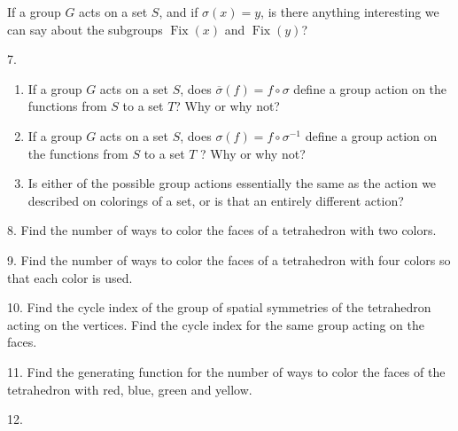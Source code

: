 \documentclass[10pt,]{book}
\theoremstyle{plain}
\theoremstyle{definition}
\theoremstyle{definition}
\numberwithin{equation}{chapter}
\newcommand{\importantarrow}{\Rightarrow}
\DeclareMathOperator{\Fix}{Fix}
\begin{document}
\begin{exerciselist}
If a group \(G\) acts on a set \(S\), and if \(\sigma(x) =y\), is there anything interesting we can say about the subgroups \(\Fix(x)\) and \(\Fix(y)\)?%
\par\smallskip
\item[7.]\marginsymbol[-1em]{} \hypertarget{exercise-60}{}\hypertarget{p-1827}{}%
\leavevmode%
\begin{enumerate}[label=(\alph*)]
\item\hypertarget{li-120}{}\hypertarget{p-1828}{}%
If a group \(G\) acts on a set \(S\), does \(\overline{\sigma}(f) = f\circ\sigma\) define a group action on the functions from \(S\) to a set \(T\)? Why or why not?%
\item\hypertarget{li-121}{}\hypertarget{p-1829}{}%
If a group \(G\) acts on a set \(S\), does \(\sigma(f)=f\circ\sigma^{-1}\) define a group action on the functions from \(S\) to a set \(T\) ? Why or why not?%
\item\hypertarget{li-122}{}\hypertarget{p-1830}{}%
Is either of the possible group actions essentially the same as the action we described on colorings of a set, or is that an entirely different action?%
\end{enumerate}
%
\par\smallskip
\item[8.]\marginsymbol[-1em]{} \hypertarget{exercise-61}{}\hypertarget{p-1835}{}%
Find the number of ways to color the faces of a tetrahedron with two colors.%
\par\smallskip
\item[9.]\marginsymbol[-1em]{} \hypertarget{exercise-62}{}\hypertarget{p-1836}{}%
Find the number of ways to color the faces of a tetrahedron with four colors so that each color is used.%
\par\smallskip
\item[10.]\marginsymbol[-1em]{} \hypertarget{exercise-63}{}\hypertarget{p-1837}{}%
Find the cycle index of the group of spatial symmetries of the tetrahedron acting on the vertices.  Find the cycle index for the same group acting on the faces.%
\par\smallskip
\item[11.]\marginsymbol[-1em]{} \hypertarget{exercise-64}{}\hypertarget{p-1838}{}%
Find the generating function for the number of ways to color the faces of the tetrahedron with red, blue, green and yellow.%
\par\smallskip
\item[12.]\marginsymbol[-1em]{\pdftooltip{$\importantarrow$}{especially interesting}} \hypertarget{exercise-65}{}\hypertarget{p-1839}{}%

\end{exerciselist}
\end{document}
